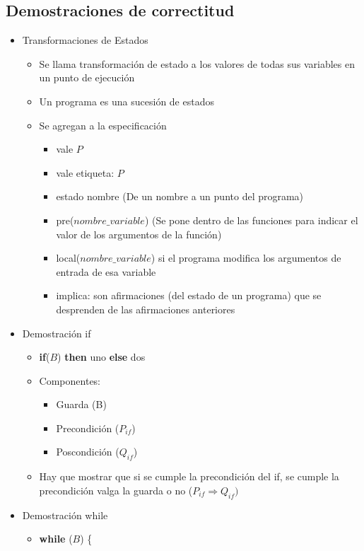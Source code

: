 \documentclass[a4paper,10pt]{article}
\begin{document}
\subsection{Demostraciones de correctitud}
    \begin{itemize}
    	\item Transformaciones de Estados
	\begin{itemize}
	    \item Se llama transformación de estado a los valores de todas sus variables en un punto de ejecución
	    \item Un programa es una sucesión de estados
	    \item Se agregan a la especificación
	    \begin{itemize}
		\item vale $P$
		\item vale etiqueta: $P$
		\item estado nombre (De un nombre a un punto del programa)
		\item pre($nombre\_variable$) (Se pone dentro de las funciones para indicar el valor de los argumentos de la función)
		\item local($nombre\_variable$) si el programa modifica los argumentos de entrada de esa variable
		\item implica: son afirmaciones (del estado de un programa) que se desprenden de las afirmaciones anteriores
	    \end{itemize}
	\end{itemize}
	\item Demostración if
	\begin{itemize}
	    \item \textbf{if}($B$) \textbf{then} uno \textbf{else} dos
	    \item Componentes:
	    \begin{itemize}
		\item Guarda (B)
		\item Precondición ($P_{if}$)
		\item Poscondición ($Q_{if}$)
	    \end{itemize}
	    \item Hay que mostrar que si se cumple la precondición del if, se cumple la precondición valga la guarda o no ($P_{if} \Rightarrow Q_{if})$
	\end{itemize}	
	\item Demostración while
	\begin{itemize}
	    \item 
	    \textbf{while} ($B$) \{ \\

\end{itemize}
\end{itemize}
\end{document}
